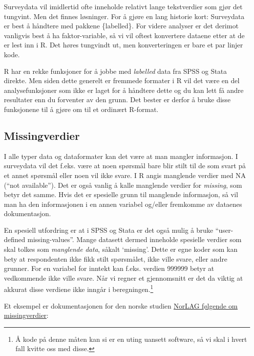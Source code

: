 \documentclass[
  letterpaper,
  DIV=11,
  numbers=noendperiod]{scrreprt}
\begin{document}
Surveydata vil imidlertid ofte inneholde relativt lange tekstverdier som
gjør det tungvint. Men det finnes løsninger. For å gjøre en lang
historie kort: Surveydata er best å håndtere med pakkene \{labelled\}.
For videre analyser er det derimot vanligvis best å ha faktor-variable,
så vi vil oftest konvertere dataene etter at de er lest inn i R. Det
høres tungvindt ut, men konverteringen er bare et par linjer kode.

R har en rekke funksjoner for å jobbe med \emph{labelled} data fra SPSS
og Stata direkte. Men siden dette generelt er fremmede formater i R vil
det være en del analysefunksjoner som ikke er laget for å håndtere dette
og du kan lett få andre resultater enn du forventer av den grunn. Det
bester er derfor å bruke disse funksjonene til å gjøre om til et
ordinært R-format.

\hypertarget{missingverdier}{%
\subsection{Missingverdier}\label{missingverdier}}

I alle typer data og dataformater kan det være at man mangler
informasjon. I surveydata vil det f.eks. være at noen spørsmål bare blir
stilt til de som svart på et annet spørsmål eller noen vil ikke svare. I
R angis manglende verdier med NA (``not available''). Det er også vanlig
å kalle manglende verdier for \emph{missing}, som betyr det samme. Hvis
det er spesielle grunn til manglende informasjon, så vil man ha den
informasjonen i en annen variabel og/eller fremkomme av dataenes
dokumentasjon.

En spesiell utfordring er at i SPSS og Stata er det også mulig å bruke
``user-defined missing-values''. Mange datasett dermed inneholde
spesielle verdier som skal tolkes som \emph{manglende data}, såkalt
`missing'. Dette er egne koder som kan bety at respondenten ikke fikk
stilt spørsmålet, ikke ville svare, eller andre grunner. For en variabel
for inntekt kan f.eks. verdien 999999 betyr at vedkommende ikke ville
svare. Når vi regner et gjennomsnitt er det da viktig at akkurat disse
verdiene ikke inngår i beregningen.\footnote{Å kode på denne måten kan
  si er en uting uansett software, så vi skal i hvert fall kvitte oss
  med disse.}

Et eksempel er dokumentasjonen for den norske studien
\href{https://norlag.nsd.no/filterverdier}{NorLAG følgende om
missingverdier}:
\end{document}
